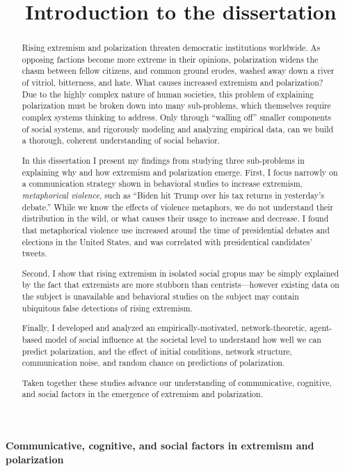 \documentclass[12pt,letterpaper]{article}
\title{Introduction to the dissertation}
\date{}
\begin{document}

\vspace{-2in}
\textbf{Communicative, cognitive, and social factors in
extremism and polarization}
\begin{abstract}
  Rising extremism and polarization threaten democratic institutions worldwide.
  As opposing factions become more extreme in their opinions, polarization
  widens the chasm between fellow citizens, and common ground erodes, washed
  away down a river of vitriol, bitterness, and hate. What causes increased
  extremism and polarization? Due to the highly complex nature of human
  societies, this problem of explaining polarization must be broken down into
  many sub-problems, which themselves require complex systems thinking to
  address. Only through ``walling off'' smaller components of social systems,
  and rigorously modeling and analyzing empirical data,
  can we build a thorough, coherent understanding of social behavior.

  In this dissertation I present my findings from studying three
  sub-problems in explaining why and how extremism and polarization emerge.
  First, I focus narrowly on a communication strategy shown in behavioral
  studies to increase extremism, \emph{metaphorical violence}, such as 
  ``Biden hit Trump over his tax returns in yesterday's debate.'' While we know
  the effects of violence metaphors, we do not understand their distribution
  in the wild, or what causes their usage to increase and decrease. I found
  that metaphorical violence use increased around the time of presidential
  debates and elections in the United States, and was correlated with 
  presidentical candidates' tweets. 

  Second, I show that rising extremism
  in isolated social gropus may be simply explained by the fact that
  extremists are more stubborn than centrists---however existing data on the
  subject is unavailable and behavioral studies on the subject may
  contain ubiquitous false detections of rising extremism. 

  Finally, I developed
  and analyzed an empirically-motivated, network-theoretic, agent-based model of 
  social influence at the societal level to understand how well we can 
  predict polarization, and the effect of initial conditions, network structure,
  communication noise, and random chance on predictions of polarization.

  Taken together these studies advance our understanding of communicative,
  cognitive, and social factors in the emergence of extremism and polarization.
\end{abstract}
\end{document}
